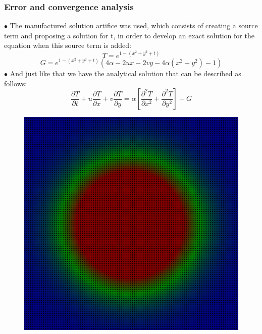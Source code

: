 \documentclass[xcolor=dvipsnames,10pt,aspectratio=169]{beamer}
\begin{document}
\begin{frame}
	\frametitle{Error and convergence analysis}
	\begin{minipage}[h!]{0.77\textwidth}
		$\bullet$ The manufactured solution artifice was used, which consists of creating a source term and proposing a solution for t, in order to develop an exact solution for the equation when this source term is added:
		\begin{equation}
			T = e ^{1 - (x^2 + y^2 + t)}
		\end{equation}
		\begin{equation}
			G = e^{1 - (x^2 + y^2 + t)} \left( 4 \alpha - 2 u x - 2 v y - 4 \alpha (x^2 + y^2) - 1 \right)
		\end{equation}
		$\bullet$ And just like that we have the analytical solution that can be described as follows:
		\begin{equation}
			\frac{\partial T}{\partial t} + u \frac{\partial T}{\partial x} + v \frac{\partial T}{\partial y} = \alpha \left[  \frac{\partial^2 T}{\partial x^2} + \frac{\partial^2 T}{\partial y^2}   \right] + G
		\end{equation}
	\end{minipage}
	\begin{minipage}[h!]{0.17\textwidth}
		\begin{figure}[h!]
			\centering
			\includegraphics[trim = {0cm 0cm 0cm 0cm}, clip , angle=0, scale=0.1]{figuras/Analise_manufaturada}

\end{figure}
\end{minipage}
\end{frame}
\end{document}
